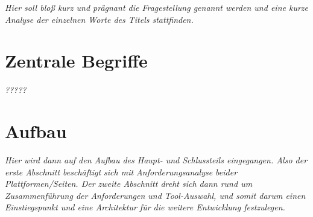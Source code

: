 \emph{Hier soll bloß kurz und prägnant die Fragestellung genannt werden und eine kurze Analyse der einzelnen Worte des Titels stattfinden.}

\section{Zentrale Begriffe}
\label{sec:zentrale_begriffe}

\emph{?????}

\section{Aufbau}
\label{sec:aufbau}

\emph{Hier wird dann auf den Aufbau des Haupt- und Schlussteils eingegangen. Also der erste Abschnitt beschäftigt sich mit Anforderungsanalyse beider Plattformen/Seiten. Der zweite Abschnitt dreht sich dann rund um Zusammenf\"uhrung der Anforderungen und Tool-Auswahl, und somit darum einen Einstiegspunkt und eine Architektur f\"ur die weitere Entwicklung festzulegen. }
